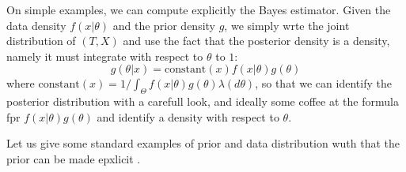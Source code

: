 \documentclass[
	fontsize=11pt, %
	twoside=false, %
	numbers=noenddot, %
]{kaobook}
\begin{document}
\begin{recipe}
	On simple examples, we can compute explicitly the Bayes estimator. Given the data density $f(x | \theta)$ and  the prior density $g$, we simply wrte the joint distribution of $(T, X)$ and use the fact that the posterior density is a density, namely it must integrate with respect to $\theta$ to $1$:
	\begin{equation*}
		g(\theta | x) = \mathrm{constant}(x) f(x | \theta) g(\theta)
	\end{equation*}
	where $\mathrm{constant}(x) =  1 / \int_\Theta f(x | \theta) g(\theta) \lambda(d \theta)$, so that we can identify the posterior distribution with a carefull look, and ideally some coffee at the formula fpr $f(x | \theta) g(\theta)$ and identify a density with respect to $\theta$.
\end{recipe}

Let us give some standard examples of prior and data distribution wuth that the prior can be made epxlicit .
\end{document}
